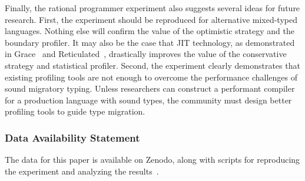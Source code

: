 Finally, the rational programmer experiment also suggests several ideas for
future research. First, the experiment should be reproduced for alternative
mixed-typed languages. Nothing else will confirm the value of the optimistic
strategy and the boundary profiler.
It may also be the case that JIT technology, as demonstrated
in Grace~\cite{rmhn-ecoop-2019} and Reticulated~\cite{vsc-dls-2019}, drastically improves the value
of the conservative strategy and statistical profiler.
Second, the
experiment clearly demonstrates that existing profiling tools are not enough to
overcome the performance challenges of sound migratory typing. Unless researchers
can construct a performant compiler for a production language with sound
types, the community must design better profiling tools to guide
type migration.











\subsubsection*{Data Availability Statement}

The data for this paper is available on Zenodo,
along with scripts for reproducing the experiment
and analyzing the results~\cite{gdf-artifact-2023}.

